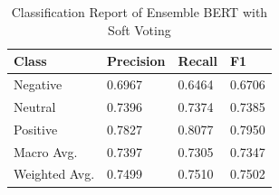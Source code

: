 \documentclass[runningheads]{llncs}
\begin{document}
\begin{table}[!ht]
    \centering
    \caption{Classification Report of Ensemble BERT with Soft Voting}
    \begin{tabular}{llll}
        \toprule
        \textbf{Class} & \textbf{Precision} & \textbf{Recall} & \textbf{F1}\\
        \midrule
         Negative &  0.6967 &  0.6464 &  0.6706 \\
         Neutral  &  0.7396 &  0.7374 &  0.7385 \\
         Positive &  0.7827 &  0.8077 &  0.7950 \\
        \midrule
   Macro Avg. &  0.7397 &  0.7305 &  0.7347 \\
Weighted Avg. &  0.7499 &  0.7510 &  0.7502 \\
        \bottomrule
    \end{tabular}
\end{table}
\end{document}
